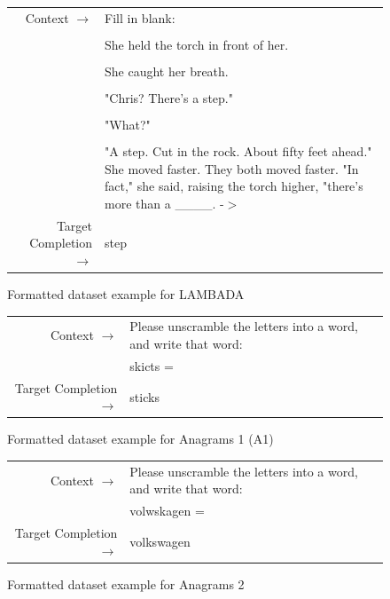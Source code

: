 \begin{figure} { \tt \footnotesize \begin{tabularx}{\linewidth}{r X} \toprule Context $\to$ & Fill in blank: \\ 
 &  \\ 
 & She held the torch in front of her. \\ 
 &  \\ 
 & She caught her breath. \\ 
 &  \\ 
 & "Chris? There's a step." \\ 
 &  \\ 
 & "What?" \\ 
 &  \\ 
 & "A step. Cut in the rock. About fifty feet ahead." She moved faster. They both moved faster. "In fact," she said, raising the torch higher, "there's more than a \_\_\_\_. -\ensuremath{>} \\ 
 \midrule Target Completion $\to$ & step\\ \bottomrule \end{tabularx} }  \caption{Formatted dataset example for LAMBADA}  \label{eval:LAMBADA}  \end{figure}%
\begin{figure} { \tt \footnotesize \begin{tabularx}{\linewidth}{r X} \toprule Context $\to$ & Please unscramble the letters into a word, and write that word: \\
& skicts = \\ 
 \midrule Target Completion $\to$ & sticks\\ \bottomrule \end{tabularx} }  \caption{Formatted dataset example for Anagrams 1 (A1)}  \label{eval:A1}  \end{figure}%
\begin{figure} { \tt \footnotesize \begin{tabularx}{\linewidth}{r X} \toprule Context $\to$ & Please unscramble the letters into a word, and write that word: \\
& volwskagen = \\ 
 \midrule Target Completion $\to$ & volkswagen\\ \bottomrule \end{tabularx} }  \caption{Formatted dataset example for Anagrams 2}  \label{eval:A2}  \end{figure}%
